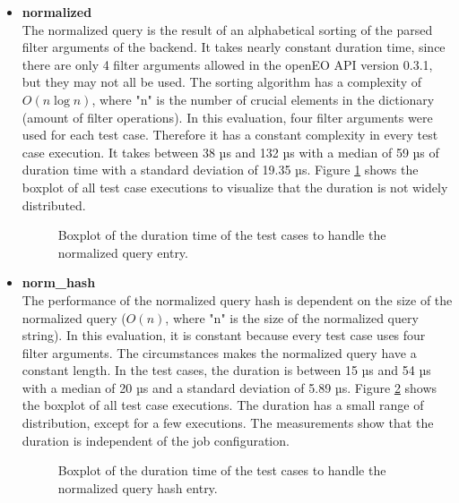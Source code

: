 \documentclass[draft,final]{vutinfth} %
\begin{document}
\begin{itemize}
	\item \textbf{normalized} \\
	The normalized query is the result of an alphabetical sorting of the parsed filter arguments of the backend. It takes nearly constant duration time, since there are only 4 filter arguments allowed in the openEO API version 0.3.1, but they may not all be used. The sorting algorithm has a complexity of $O(n\log{}n)$, where "n" is the number of crucial elements in the dictionary (amount of filter operations). In this evaluation, four filter arguments were used for each test case. Therefore it has a constant complexity in every test case execution. It takes between 38 µs and 132 µs with a median of 59 µs of duration time with a standard deviation of 19.35 µs. Figure \ref{fig:evaluation_perf_normalized} shows the boxplot of all test case executions to visualize that the duration is not widely distributed.  
	\begin{figure}[!h]
		\centering
		\caption{Boxplot of the duration time of the test cases to handle the normalized query entry.}
		\label{fig:evaluation_perf_normalized}
	\end{figure}

	\item \textbf{norm\_hash} \\
	The performance of the normalized query hash is dependent on the size of the normalized query ($O(n)$, where "n" is the size of the normalized query string). In this evaluation, it is constant because every test case uses four filter arguments. The circumstances makes the normalized query have a constant length. In the test cases, the duration is between 15 µs and 54 µs with a median of 20 µs and a standard deviation of 5.89 µs. Figure \ref{fig:evaluation_perf_norm_hash} shows the boxplot of all test case executions. The duration has a small range of distribution, except for a few executions. The measurements show that the duration is independent of the job configuration. 
	\begin{figure}[!h]
		\centering
		\caption{Boxplot of the duration time of the test cases to handle the normalized query hash entry.}
		\label{fig:evaluation_perf_norm_hash}
	\end{figure}


\end{itemize}
\end{document}
